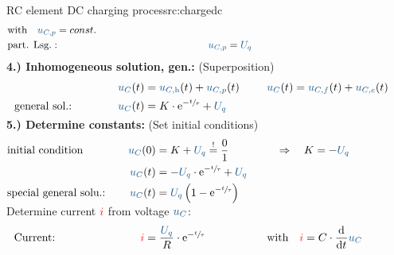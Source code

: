 {\begin{expl}{RC element DC charging process}{rc:chargedc}
\begin{align*}
                    &\text{with}\quad \ecv{u_{C,p}} = const.  \\
            &\text{part. Lsg.}:&&&
                \ecv{u_{C,p}} &= \ecv{U_q}
                \\[-15pt]&\hphantom{R1ooooooo}&&&\hphantom{L3oooooooooooooooooooo}&\hphantom{R3ooo}&&&&\hphantom{R5oooooooooooooooooooooo}\nonumber%
            \end{align*}%
        \textbf{4.) Inhomogeneous solution, gen.:} (Superposition)%
        \begin{align*}%
            &&&&
                \ecv{u_C}(t) &= \ecv{u_{C,\mathrm{h}}}(t) + \ecv{u_{C,p}}(t) &&&
                &\ecv{u_C}(t)= \ecv{u_{C,f}}(t) + \ecv{u_{C,e}}(t)  \\
            &\text{general sol.:}&&&
                \ecv{u_C}(t) &= K \cdot \mathrm{e}^{-\sfrac{t}{\tau}} + \ecv{U_q}
            \\[-15pt]&\hphantom{R1oooooooooooo}&&&\hphantom{L3ooo}&\hphantom{R3oooooooooooooooo}&&&&\hphantom{R5oooooooooooooooooooooo}\nonumber%
        \end{align*}%
        \textbf{5.) Determine constants:} (Set initial conditions)%
        \begin{align*}%
            &\text{initial condition}&&&
                \ecv{u_C}(0) &= K + \ecv{U_q} \overset{!}{=} \frac{0}{1} &&&
                &\Rightarrow\quad K = -\ecv{U_q} \\
            &&&&
                \ecv{u_C}(t) &= -\ecv{U_q} \cdot \mathrm{e}^{-\sfrac{t}{\tau}} + \ecv{U_q} \\
            &\text{special general solu.:}&&&
                \ecv{u_C}(t) &= \ecv{U_q} \left( 1 - \mathrm{e}^{-\sfrac{t}{\tau}} \right)
            \\[-15pt]&\hphantom{R1oooooooooooo}&&&\hphantom{L3ooo}&\hphantom{R3oooooooooooooooo}&&&&\hphantom{R5oooooooooooooooooooooo}\nonumber%
            \end{align*}%
        Determine current ${\color{red}i}$ from voltage $\ecv{u_C}$:%
        \begin{align*}%
            &\text{Current:}&&&
                \eci{i} &= \frac{\ecv{U_q}}{R} \cdot \mathrm{e}^{-\sfrac{t}{\tau}} &&&
                &\text{with}\quad \eci{i} = C \cdot \dt \ecv{u_C}
            \\[-15pt]&\hphantom{R1oooooooooooo}&&&\hphantom{L3ooo}&\hphantom{R3oooooooooooooooo}&&&&\hphantom{R5oooooooooooooooooooooo}\nonumber%
        \end{align*}
        \endgroup
    \end{expl}
}%


